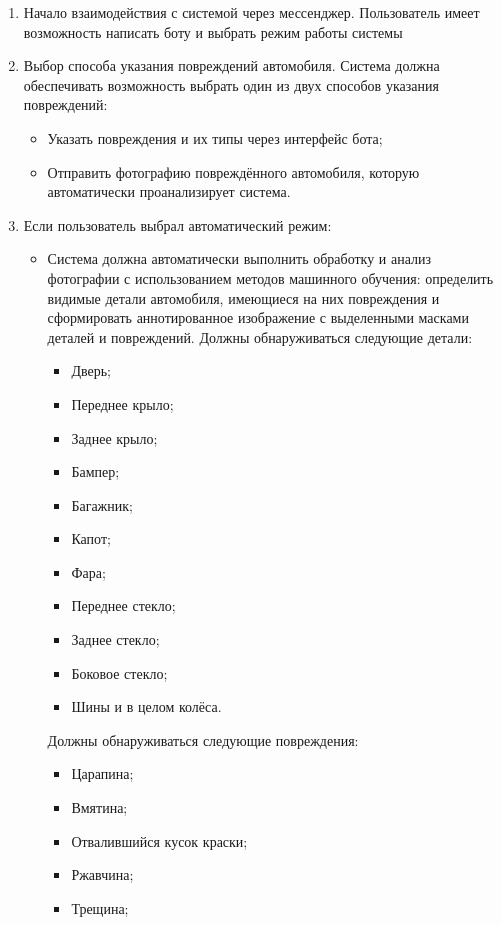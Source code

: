 \begin{enumerate}[label=\arabic*.]
    \item Начало взаимодействия с системой через мессенджер. Пользователь имеет возможность написать боту и выбрать режим работы системы
    \item Выбор способа указания повреждений автомобиля. Система должна обеспечивать возможность выбрать один из двух способов указания повреждений:
    \begin{itemize}
        \item Указать повреждения и их типы через интерфейс бота;
        \item Отправить фотографию повреждённого автомобиля, которую автоматически проанализирует система.
    \end{itemize}
    \item Если пользователь выбрал автоматический режим:
    \begin{itemize}
        \item Система должна автоматически выполнить обработку и анализ фотографии с использованием методов машинного обучения: определить видимые детали автомобиля, имеющиеся на них повреждения и сформировать аннотированное изображение с выделенными масками деталей и повреждений.
        Должны обнаруживаться следующие детали:
        \begin{itemize}
            \item Дверь;
		    \item Переднее крыло;
		    \item Заднее крыло;
		    \item Бампер;
		    \item Багажник;
		    \item Капот;
		    \item Фара;
		    \item Переднее стекло;
		    \item Заднее стекло;
		    \item Боковое стекло;
		    \item Шины и в целом колёса.
        \end{itemize}
        Должны обнаруживаться следующие повреждения:
        \begin{itemize}
            \item Царапина;
		    \item Вмятина;
		    \item Отвалившийся кусок краски;
		    \item Ржавчина;
		    \item Трещина;

\end{itemize}
\end{itemize}
\end{enumerate}
